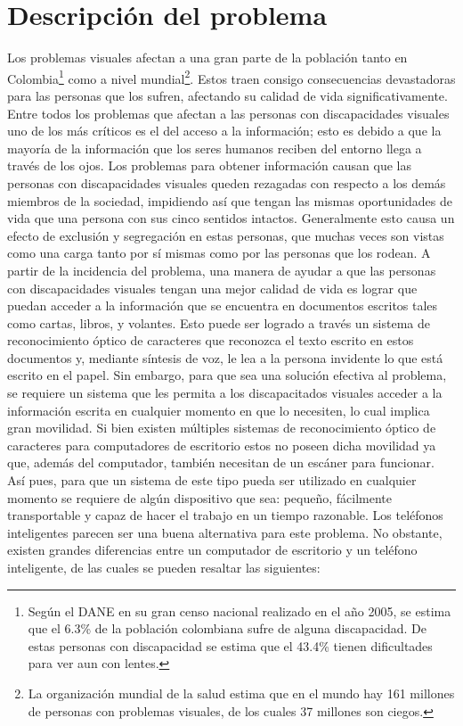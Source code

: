 \documentclass[a4paper, 11pt, oneside]{report}
\begin{document}
\section{Descripción del problema}
Los problemas visuales afectan a una gran parte de la población tanto en Colombia\footnote{Según el DANE en su gran censo nacional realizado en el año 2005, se estima que el 6.3\% de la población colombiana sufre de alguna discapacidad. De estas personas con discapacidad se estima que el 43.4\% tienen dificultades para ver aun con lentes.} como a nivel mundial\footnote{La organización mundial de la salud estima que en el mundo hay 161 millones de personas con problemas visuales, de los cuales 37 millones son ciegos.}. Estos traen consigo consecuencias devastadoras para las personas que los sufren, afectando su calidad de vida significativamente. Entre todos los problemas que afectan a las personas con discapacidades visuales uno de los más críticos es el del acceso a la información; esto es debido a que la mayoría de la información que los seres humanos reciben del entorno llega a través de los ojos. Los problemas para obtener información causan que las personas con discapacidades visuales queden rezagadas con respecto a los demás miembros de la sociedad, impidiendo así que tengan las mismas oportunidades de vida que una persona con sus cinco sentidos intactos. Generalmente esto causa un efecto de exclusión y segregación en estas personas, que muchas veces son vistas como una carga tanto por sí mismas como por las personas que los rodean. 
A partir de la incidencia del problema, una manera de ayudar a que las personas con discapacidades visuales tengan una mejor calidad de vida es lograr que puedan acceder a la información que se encuentra en documentos escritos tales como cartas, libros, y volantes. Esto puede ser logrado a través un sistema de reconocimiento óptico de caracteres que reconozca el texto escrito en estos documentos y, mediante síntesis de voz, le lea a la persona invidente lo que está escrito en el papel. Sin embargo, para que sea una solución efectiva al problema, se requiere un sistema que les permita a los discapacitados visuales acceder a la información escrita en cualquier momento en que lo necesiten, lo cual implica gran movilidad. Si bien existen múltiples sistemas de reconocimiento óptico de caracteres para computadores de escritorio estos no poseen dicha movilidad ya que, además del computador, también necesitan de un escáner para funcionar. Así pues, para que un sistema de este tipo pueda ser utilizado en cualquier momento se requiere de algún dispositivo que sea: pequeño, fácilmente transportable y capaz de hacer el trabajo en un tiempo razonable. Los teléfonos inteligentes parecen ser una buena alternativa para este problema. No obstante, existen grandes diferencias entre un computador de escritorio y un teléfono inteligente, de las cuales se pueden resaltar las siguientes:
\end{document}
